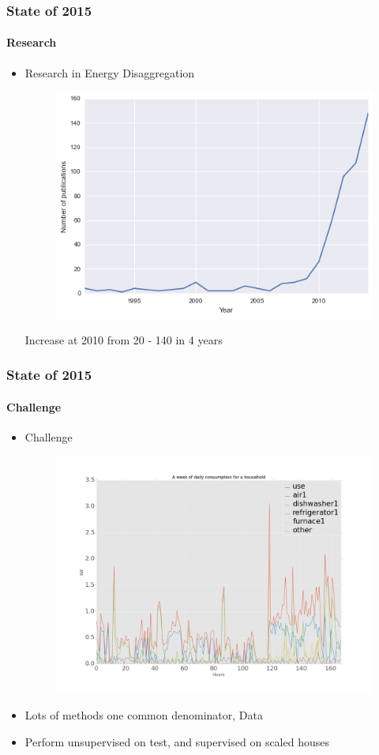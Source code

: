\documentclass[gray]{beamer}
\begin{document}
\begin{frame}
	\frametitle{State of 2015}
	\framesubtitle{Research}
	\begin{itemize}
		\item{Research in Energy Disaggregation}
			\begin{figure}[!ht]
				\colorbox{white}{\includegraphics[scale=0.50]{./figures/growth}}
			\end{figure}
			\centering
			Increase at 2010 from 20 - 140 in 4 years
	\end{itemize}
\end{frame}
\begin{frame}
	\frametitle{State of 2015}
	\framesubtitle{Challenge}
	\begin{itemize}
		\item{Challenge}
		\begin{figure}[!ht]
			\includegraphics[scale=0.18]{./figures/weekconsump}
		\end{figure}
	\end{itemize}
	\begin{itemize}
		\item{Lots of methods one common denominator, Data}
		\item{Perform unsupervised on test, and supervised on scaled houses}
	\end{itemize}
\end{frame}
\end{document}
